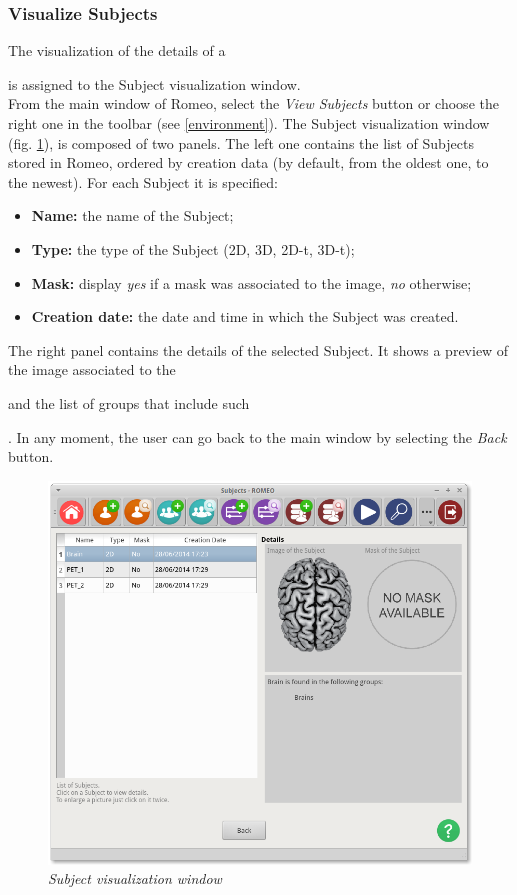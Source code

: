 \subsubsection{Visualize Subjects}
\label{visulizesubjects}
The visualization of the details of a \subject{} is assigned to the Subject\g{} visualization window.\\
From the main window of Romeo, select the \textit{View Subjects} button or choose the right one in the toolbar (see \ref{environment}). The Subject\g{} visualization window (fig. \ref{visualizesubjectimg}), is composed of two panels. The left one contains the list of Subjects\g{} stored in Romeo, ordered by creation data (by default, from the oldest one, to the newest). For each Subject\g{} it is specified:
\begin{itemize}
\item \textbf{Name:} the name of the Subject\g{};
\item \textbf{Type:} the type of the Subject\g{} (2D, 3D, 2D-t, 3D-t);
\item \textbf{Mask:} display \textit{yes} if a mask was associated to the image, \textit{no} otherwise;
\item \textbf{Creation date:} the date and time in which the Subject\g{} was created.
\end{itemize}
The right panel contains the details of the selected Subject\g{}. It shows a preview of the image associated to the \subject{} and the list of groups that include such \subject{}. In any moment, the user can go back to the main window by selecting the \textit{Back} button.
\begin{figure}[!h]
\begin{center}
\includegraphics[scale=0.4]{./Images/ViewSubjects}
\caption{\textit{Subject visualization window}}
\label{visualizesubjectimg}
\end{center}
\end{figure}
